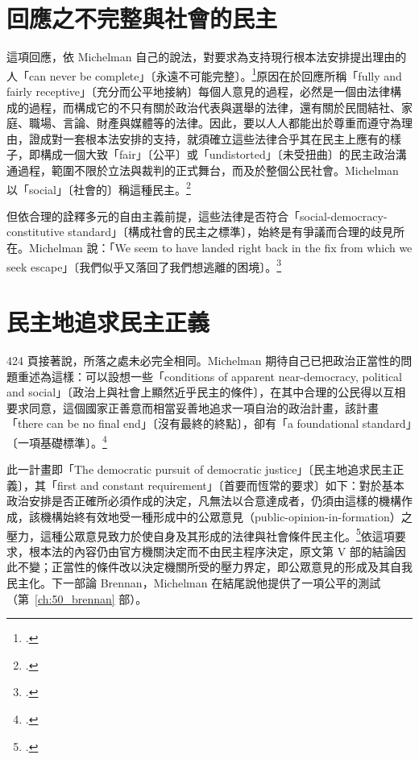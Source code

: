 \section{回應之不完整與社會的民主}
\label{sec:40_paradox-5}

這項回應，依 Michelman 自己的說法，對要求為支持現行根本法安排提出理由的人「can never be complete」〔永遠不可能完整〕。\footcite[423]{michelman1998}原因在於回應所稱「fully and fairly receptive」〔充分而公平地接納〕每個人意見的過程，必然是一個由法律構成的過程，而構成它的不只有關於政治代表與選舉的法律，還有關於民間結社、家庭、職場、言論、財產與媒體等的法律。因此，要以人人都能出於尊重而遵守為理由，證成對一套根本法安排的支持，就須確立這些法律合乎其在民主上應有的樣子，即構成一個大致「fair」〔公平〕或「undistorted」〔未受扭曲〕的民主政治溝通過程，範圍不限於立法與裁判的正式舞台，而及於整個公民社會。Michelman 以「social」〔社會的〕稱這種民主。\footcite[423--424]{michelman1998}

但依合理的詮釋多元的自由主義前提，這些法律是否符合「social-democracy-constitutive standard」〔構成社會的民主之標準〕，始終是有爭議而合理的歧見所在。Michelman 說：「We seem to have landed right back in the fix from which we seek escape」〔我們似乎又落回了我們想逃離的困境〕。\footcite[424]{michelman1998}

\section{民主地追求民主正義}
\label{sec:40_paradox-6}

424 頁接著說，所落之處未必完全相同。Michelman 期待自己已把政治正當性的問題重述為這樣：可以設想一些「conditions of apparent near-democracy, political and social」〔政治上與社會上顯然近乎民主的條件〕，在其中合理的公民得以互相要求同意，這個國家正善意而相當妥善地追求一項自治的政治計畫，該計畫「there can be no final end」〔沒有最終的終點〕，卻有「a foundational standard」〔一項基礎標準〕。\footcite[424]{michelman1998}

此一計畫即「The democratic pursuit of democratic justice」〔民主地追求民主正義〕，其「first and constant requirement」〔首要而恆常的要求〕如下：對於基本政治安排是否正確所必須作成的決定，凡無法以合意達成者，仍須由這樣的機構作成，該機構始終有效地受一種形成中的公眾意見（public-opinion-in-formation）之壓力，這種公眾意見致力於使自身及其形成的法律與社會條件民主化。\footcite[424]{michelman1998}依這項要求，根本法的內容仍由官方機關決定而不由民主程序決定，原文第 V 部的結論因此不變；正當性的條件改以決定機關所受的壓力界定，即公眾意見的形成及其自我民主化。下一部論 Brennan，Michelman 在結尾說他提供了一項公平的測試（第~\ref{ch:50_brennan} 部）。

